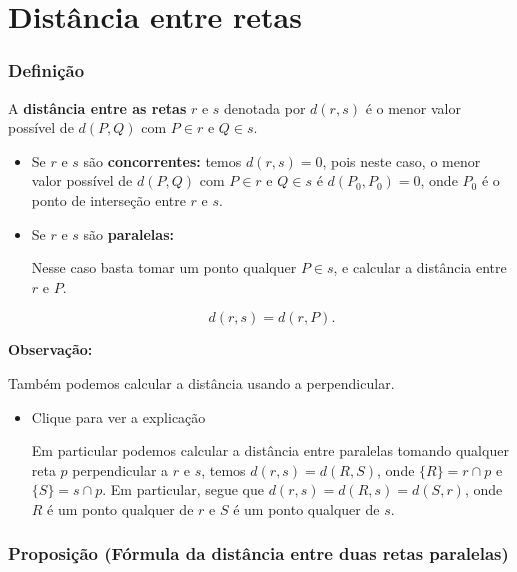 \documentclass[
  brazilian,
  letterpaper,
  DIV=11,
  numbers=noendperiod]{scrreprt}
\theoremstyle{definition}
\theoremstyle{plain}
\theoremstyle{definition}
\theoremstyle{remark}
\begin{document}

\chapter{Distância entre retas}\label{distuxe2ncia-entre-retas}

\subsection{Definição}\label{definiuxe7uxe3o-12}

A \textbf{distância entre as retas} \(r\) e \(s\) denotada por
\(d(r,s)\) é o menor valor possível de \(d(P,Q)\) com \(P\in r\) e
\(Q\in s\).

\begin{itemize}
\item
  Se \(r\) e \(s\) são \textbf{concorrentes:} temos \(d(r,s) = 0\), pois
  neste caso, o menor valor possível de \(d(P,Q)\) com \(P\in r\) e
  \(Q\in s\) é \(d(P_0,P_0) = 0\), onde \(P_0\) é o ponto de interseção
  entre \(r\) e \(s\).
\item
  Se \(r\) e \(s\) são \textbf{paralelas:}

  Nesse caso basta tomar um ponto qualquer \(P \in s\), e calcular a
  distância entre \(r\) e \(P\).

  \[
    d(r,s)=d(r,P).
    \]
\end{itemize}

\textbf{Observação:}

Também podemos calcular a distância usando a perpendicular.

\begin{itemize}
\item
  Clique para ver a explicação

  Em particular podemos calcular a distância entre paralelas tomando
  qualquer reta \(p\) perpendicular a \(r\) e \(s\), temos
  \(d(r,s) = d(R,S)\), onde \(\{R\} = r\cap p\) e \(\{S\} = s\cap p\).
  Em particular, segue que \(d(r,s) = d(R,s) = d(S,r)\), onde \(R\) é um
  ponto qualquer de \(r\) e \(S\) é um ponto qualquer de \(s\).
\end{itemize}

\subsection{\texorpdfstring{Proposição (\textbf{Fórmula da distância
entre duas retas
paralelas})}{Proposição (Fórmula da distância entre duas retas paralelas)}}\label{proposiuxe7uxe3o-fuxf3rmula-da-distuxe2ncia-entre-duas-retas-paralelas}
\end{document}
